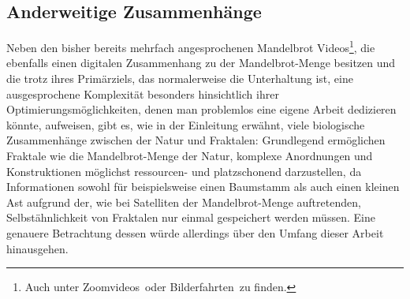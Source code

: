 \subsection{Anderweitige Zusammenhänge}\label{subsec:other-connections}

Neben den bisher bereits mehrfach angesprochenen
\glqq Mandelbrot Videos\grqq\footnote{
  Auch unter \glqq Zoomvideos\grqq~oder \glqq Bilderfahrten\grqq~zu finden.
}, die ebenfalls einen digitalen Zusammenhang zu der Mandelbrot-Menge besitzen
und die trotz ihres Primärziels, das normalerweise die Unterhaltung ist, eine
ausgesprochene Komplexität besonders hinsichtlich ihrer Optimierungsmöglichkeiten,
denen man problemlos eine eigene Arbeit dedizieren könnte, aufweisen,
gibt es, wie in der Einleitung erwähnt,
viele biologische Zusammenhänge zwischen der Natur und Fraktalen:
Grundlegend ermöglichen Fraktale wie die Mandelbrot-Menge der Natur,
komplexe Anordnungen und Konstruktionen möglichst ressourcen- und platzschonend
darzustellen, da Informationen sowohl für beispielsweise einen Baumstamm als auch
einen kleinen Ast aufgrund der, wie bei Satelliten der Mandelbrot-Menge auftretenden,
Selbstähnlichkeit von Fraktalen nur einmal gespeichert werden müssen.
Eine genauere Betrachtung dessen würde allerdings über den Umfang
dieser Arbeit hinausgehen.